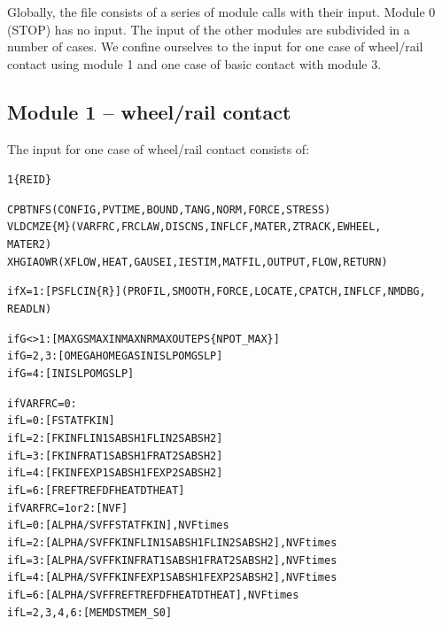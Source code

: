 \documentclass[12pt]{report}
\renewcommand{\magenta}[1]{}
\begin{document}
Globally, the file consists of a series of module calls with their input.
Module 0 (STOP) has no input. The input of the other modules are subdivided
in a number of cases. We confine ourselves to the input for one case of
wheel/rail contact using module 1 and one case of basic contact with module 3.

\subsection{Module 1 -- wheel/rail contact}

The input for one case of wheel/rail contact consists of:
\begin{alltt}\small
 1   \{REID\}    %


 CPBTNFS       (        CONFIG, PVTIME, BOUND , TANG  , NORM  , FORCE , STRESS)
 VLDCMZE \{\magenta{ZM}M\} (        VARFRC, FRCLAW, DISCNS, INFLCF, MATER , ZTRACK, EWHEEL,
                                                        \magenta{ZTRCK2,} \magenta{MATER3,} MATER2)
XHGIAOWR       (XFLOW , HEAT  , GAUSEI, IESTIM, MATFIL, OUTPUT, FLOW  , RETURN)


if X=1: [ PSFLCIN \{R\} ] (PROFIL, SMOOTH, FORCE, LOCATE, CPATCH, INFLCF, NMDBG,
                                                                        READLN)


if G<>1:      [ MAXGS   MAXIN   MAXNR   MAXOUT  EPS   \{NPOT\_MAX\}   ]
if G=2,3:     [ OMEGAH  OMEGAS  INISLP  OMGSLP        ]
if G=4:       [ INISLP  OMGSLP                        ]
\magenta{if G=5:       [ FDECAY  BETATH  KDOWFB  D\_IFC   D\_LIN   D\_CNS   D\_SLP   POW\_S ]
}

if VARFRC=0:
      if L=0: [ FSTAT  FKIN                                ]
      if L=2: [ FKIN   FLIN1  SABSH1  FLIN2  SABSH2        ]
      if L=3: [ FKIN   FRAT1  SABSH1  FRAT2  SABSH2        ]
      if L=4: [ FKIN   FEXP1  SABSH1  FEXP2  SABSH2        ]
      if L=6: [ FREF   TREF   DFHEAT  DTHEAT               ]
if VARFRC=1 or 2:  [ NVF                                        ]
      if L=0: [ ALPHA/SVF   FSTAT  FKIN                         ], NVF times
      if L=2: [ ALPHA/SVF   FKIN   FLIN1  SABSH1  FLIN2  SABSH2 ], NVF times
      if L=3: [ ALPHA/SVF   FKIN   FRAT1  SABSH1  FRAT2  SABSH2 ], NVF times
      if L=4: [ ALPHA/SVF   FKIN   FEXP1  SABSH1  FEXP2  SABSH2 ], NVF times
      if L=6: [ ALPHA/SVF   FREF   TREF   DFHEAT  DTHEAT        ], NVF times
if L=2,3,4,6: [ MEMDST MEM\_S0                                   ]


\end{alltt}
\end{document}
